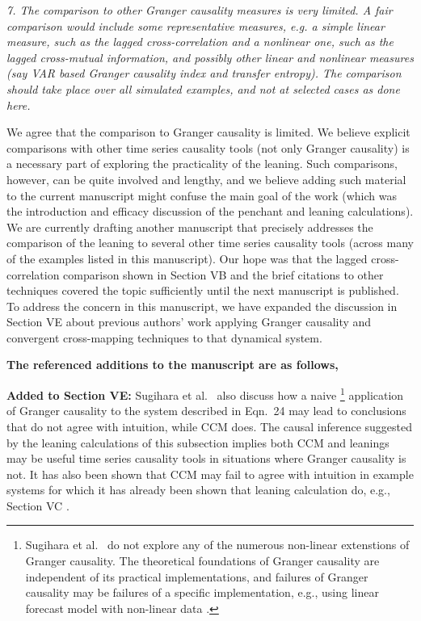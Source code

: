 \documentclass[a4paper,11pt]{article}
\begin{document}
\vspace{0.5cm}
{\em 7. The comparison to other Granger causality measures is very limited.  A fair comparison would include some representative measures, e.g. a simple linear measure, such as the lagged cross-correlation and a nonlinear one, such as the lagged cross-mutual information, and possibly other linear and nonlinear measures (say VAR based Granger causality index and transfer entropy). The comparison should take place over all simulated examples, and not at selected cases as done here.}
\vspace{0.5cm}

We agree that the comparison to Granger causality is limited.  We believe explicit comparisons with other time series causality tools (not only Granger causality) is a necessary part of exploring the practicality of the leaning.  Such comparisons, however, can be quite involved and lengthy, and we believe adding such material to the current manuscript might confuse the main goal of the work (which was the introduction and efficacy discussion of the penchant and leaning calculations).  We are currently drafting another manuscript that  precisely addresses the comparison of the leaning to several other time series causality tools (across many of the examples listed in this manuscript). Our hope was that the lagged cross-correlation comparison shown in Section VB and the brief citations to other techniques covered the topic sufficiently until the next manuscript is published.  To address the concern in this manuscript, we have expanded the discussion in Section VE about previous authors' work applying Granger causality and convergent cross-mapping techniques to that dynamical system.  

{\bf The referenced additions to the manuscript are as follows,}

{\bf Added to Section VE:} Sugihara et al.\ \cite{Sugihara2012} also discuss how a naive \footnote{Sugihara et al.\ \cite{Sugihara2012} do not explore any of the numerous non-linear extenstions of Granger causality.  The theoretical foundations of Granger causality are independent of its practical implementations, and failures of Granger causality may be failures of a specific implementation, e.g., using linear forecast model with non-linear data \cite{Granger1980}.} application of Granger causality to the system described in Eqn.\ 24 may lead to conclusions that do not agree with intuition, while CCM does.  The causal inference suggested by the leaning calculations of this subsection implies both CCM and leanings may be useful time series causality tools in situations where Granger causality is not.  It has also been shown that CCM may fail to agree with intuition in example systems for which it has already been shown that leaning calculation do, e.g., Section VC \cite{Weigel2014}.
\end{document}
